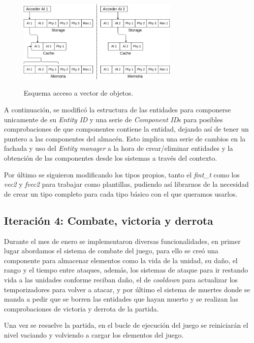 \begin{figure}[hbt]
\centering
\includegraphics[width=0.7\textwidth]{imagenes/diario_desarrollo/memoria1.png}\\
\caption{Esquema acceso a vector de objetos.}
\label{fig:memoria_obj}
\end{figure}

A continuación, se modificó la estructura de las entidades para componerse unicamente de su
\textit{Entity ID} y una serie de \textit{Component ID}s para posibles comprobaciones de que
componentes contiene la entidad, dejando así de tener un puntero a las componentes del almacén.
Esto implica una serie de cambios en la fachada y uso del \textit{Entity manager} a la hora
de crear/eliminar entidades y la obtención de las componentes desde los sistemas a través del
contexto. 

Por último se siguieron modificando los tipos propios, tanto el \textit{fint\_t} como
los \textit{vec2} y \textit{fvec2} para trabajar como plantillas, pudiendo así librarnos de
la necesidad de crear un tipo completo para cada tipo básico con el que queramos usarlos.

\subsection*{Iteración 4: Combate, victoria y derrota}
Durante el mes de enero se implementaron diversas funcionalidades, en primer lugar abordamos
el sistema de combate del juego, para ello se creó una componente para almacenar elementos como
la vida de la unidad, su daño, el rango y el tiempo entre ataques, además, los sistemas de 
ataque para ir restando vida a las unidades conforme reciban daño, el de \textit{cooldown} para
actualizar los temporizadores para volver a atacar, y por último el sistema de muertes donde se
manda a pedir que se borren las entidades que hayan muerto y se realizan las comprobaciones 
de victoria y derrota de la partida.

Una vez se resuelve la partida, en el bucle de ejecución del juego se reiniciarán el nivel
vaciando y volviendo a cargar los elementos del juego.

